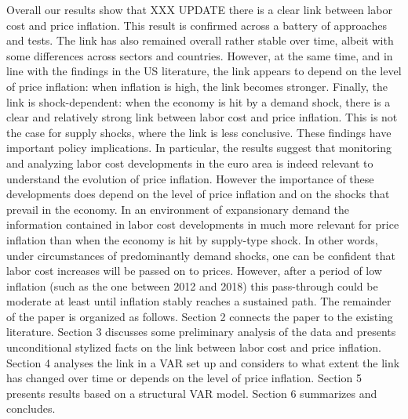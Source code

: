 \documentclass[11pt]{article}
\begin{document}
Overall our results show that XXX UPDATE there is a clear link between labor cost and price inflation. This result is confirmed across a battery of approaches and tests. The link has also remained overall rather stable over time, albeit with some differences across sectors and countries. However, at the same time, and in line with the findings in the US literature, the link appears to depend on the level of price inflation: when inflation is high, the link becomes stronger. Finally, the link is shock-dependent: when the economy is hit by a demand shock, there is a clear and relatively strong link between labor cost and price inflation. This is not the case for supply shocks, where the link is less conclusive. These findings have important policy implications. In particular, the results suggest that monitoring and analyzing labor cost developments in the euro area is indeed relevant to understand the evolution of price inflation. However the importance of these developments does depend on the level of price inflation and on the shocks that prevail in the economy. In an environment of expansionary demand the information contained in labor cost developments in much more relevant for price inflation than when the economy is hit by supply-type shock. In other words, under circumstances of predominantly demand shocks, one can be confident that labor cost increases will be passed on to prices. However, after a period of low inflation (such as the one between 2012 and 2018) this pass-through could be moderate at least until inflation stably reaches a sustained path. The remainder of the paper is organized as follows. Section 2 connects the paper to the existing literature. Section 3 discusses some preliminary analysis of the data and presents unconditional stylized facts on the link between labor cost and price inflation. Section 4 analyses the link in a VAR set up and considers to what extent the link has changed over time or depends on the level of price inflation. Section 5 presents results based on a structural VAR model. Section 6 summarizes and concludes.


\end{document}
